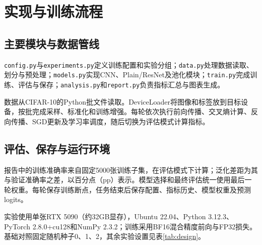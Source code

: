 \section{实现与训练流程}
\subsection{主要模块与数据管线}
\texttt{config.py}与\texttt{experiments.py}定义训练配置和实验分组；\texttt{data.py}处理数据读取、划分与预处理；\texttt{models.py}实现CNN、Plain/ResNet及池化模块；\texttt{train.py}完成训练、评估与保存；\texttt{analysis.py}和\texttt{report.py}负责指标汇总与图表生成。

数据从CIFAR-10的Python批文件读取。DeviceLoader将图像和标签放到目标设备，按批完成采样、标准化和训练增强。每轮依次执行前向传播、交叉熵计算、反向传播、SGD更新及学习率调度，随后切换为评估模式计算指标。

\subsection{评估、保存与运行环境}
报告中的训练准确率来自固定5000张训练子集，在评估模式下计算；泛化差距为其与验证准确率之差，以百分点（pp）表示。模型选择和最终评估统一使用最后一轮权重。每轮保存训练断点，任务结束后保存配置、指标历史、模型权重及预测logits。

实验使用单张RTX 5090（约32GB显存），Ubuntu 22.04、Python 3.12.3、PyTorch 2.8.0+cu128和NumPy 2.3.2；训练采用BF16混合精度前向与FP32损失。基础对照固定随机种子0、1、2，其余实验设置见表\ref{tab:design}。
